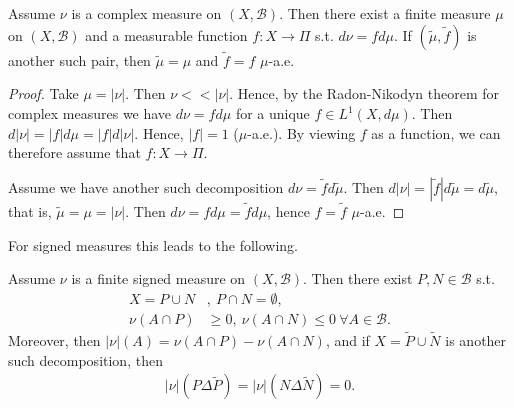\fi
\begin{theorem}
    Assume \(\nu\) is a complex measure on \((X,\mathscr{B})\). Then there exist a finite measure \(\mu\) on \((X,\mathscr{B})\) and a measurable function \(f:X\rightarrow \Pi\) s.t. \(d\nu=fd\mu\). If \((\tilde{\mu},\tilde{f})\) is another such pair, then \(\tilde{\mu}=\mu\) and \(\tilde{f}=f\)  \(\mu\)-a.e.
\end{theorem}
\ifdetailed
\begin{proof}
    Take \(\mu = |\nu|\). Then \(\nu<<|\nu|\). Hence, by the Radon-Nikodyn theorem for complex measures we have \(d\nu=fd\mu\) for a unique \(f\in L^1(X,d\mu)\). Then \(d|\nu| = |f|d\mu = |f|d|\nu|\). Hence, \(|f| = 1\) (\(\mu\)-a.e.). By viewing \(f\) as a function, we can therefore assume that \(f:X\rightarrow \Pi\).

    Assume we have another such decomposition \(d\nu = \tilde{f}d\tilde{\mu}\). Then \(d|\nu|=|\tilde{f}|d\tilde{\mu}=d\tilde{\mu}\), that is, \(\tilde{\mu}=\mu=|\nu|\). Then \(d\nu = fd\mu = \tilde{f}d\mu\), hence \(f=\tilde{f}\) \(\mu\)-a.e.
\end{proof}
\fi 
For signed measures this leads to the following.
\begin{theorem}
    Assume \(\nu\) is a finite signed measure on \((X,\mathscr{B})\). Then there exist \(P,N\in\mathscr{B}\) s.t. 
    \begin{align*}
        X = P\cup N &, \ P\cap N = \emptyset, \\
        \nu\left(A\cap P\right) &\geq 0, \ \nu\left(A\cap N\right) \leq 0 \ \forall A\in\mathscr{B}.
    \end{align*}
    Moreover, then \(|\nu|(A) = \nu\left(A\cap P\right) - \nu\left(A\cap N\right)\), and if \(X = \tilde{P}\cup \tilde{N}\) is another such decomposition, then 
    \begin{align*}
        |\nu|\left(P\Delta \tilde{P}\right) = |\nu|\left(N\Delta\tilde{N}\right) = 0.
    \end{align*}
\end{theorem}
\ifdetailed
